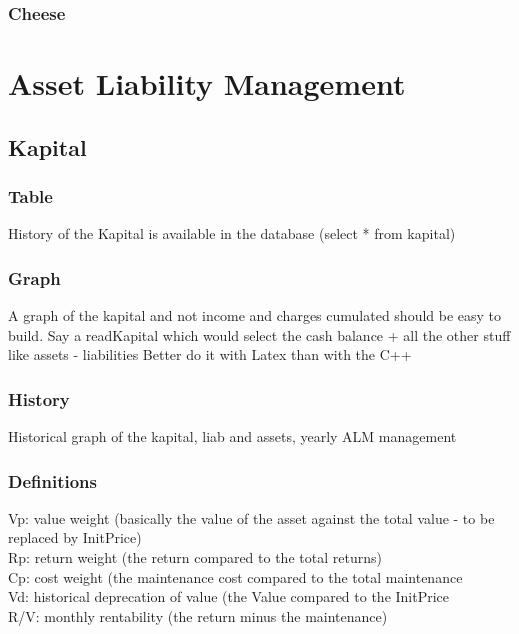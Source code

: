 \documentclass[8pt]{article} %
\begin{document}
\subsubsection{Cheese}


\section{Asset Liability Management}

\subsection{Kapital}

\subsubsection{Table}
History of the Kapital is available in the database (select * from kapital)


\subsubsection{Graph}
A graph of the kapital and not income and charges cumulated should be easy to build.
Say a readKapital which would select the cash balance + all the other stuff like assets - liabilities
Better do it with Latex than with the C++ 

\subsubsection{History}
{\footnotesize
Historical graph of the kapital, liab and assets, yearly ALM management\\
}

\subsubsection{Definitions}
{\footnotesize
Vp: value weight (basically the value of the asset against the total value - to be replaced by InitPrice)\\
Rp: return weight (the return compared to the total returns)\\
Cp: cost weight (the maintenance cost compared to the total maintenance\\
Vd: historical deprecation of value (the Value compared to the InitPrice\\
R/V: monthly rentability (the return minus the maintenance)\\}
\end{document}
